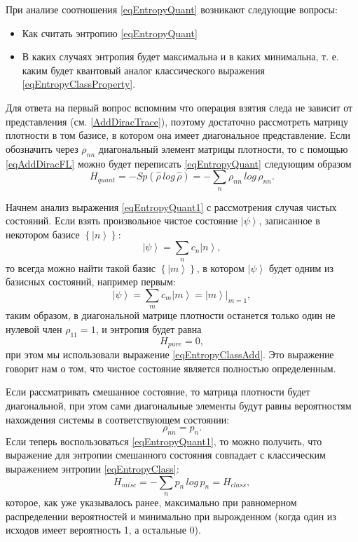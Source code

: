 При анализе соотношения \eqref{eqEntropyQuant} возникают следующие
вопросы:
\begin{itemize}
\item Как считать энтропию \eqref{eqEntropyQuant}
\item В каких случаях энтропия будет максимальна и в каких минимальна,
  т. е. каким будет квантовый аналог классического выражения
  \ref{eqEntropyClassProperty}. 
\end{itemize}

Для ответа на первый вопрос вспомним что операция взятия следа не
зависит от представления (см. \autoref{AddDiracTrace}), поэтому
достаточно рассмотреть матрицу плотности в том базисе, в котором она имеет
диагональное представление. Если обозначить через $\rho_{nn}$
диагональный элемент матрицы плотности, то с помощью \eqref{eqAddDiracFL}
можно будет переписать \eqref{eqEntropyQuant} следующим образом
\begin{equation}
H_{quant} = - Sp \left(\hat{\rho} \, log \, \hat{\rho}\right) = 
- \sum_n \rho_{nn} \, log \, \rho_{nn}.
\label{eqEntropyQuant1}
\end{equation}

Начнем анализ выражения \eqref{eqEntropyQuant1} с рассмотрения случая чистых состояний.
Если взять произвольное чистое состояние $\left|\psi\right>$,
записанное в некотором базисе $\left\{\left|n\right>\right\}$:
\[
\left|\psi\right> = \sum_n c_n \left|n\right>,
\]
то всегда можно найти такой базис $\left\{\left|m\right>\right\}$, в
котором $\left|\psi\right>$ будет одним из базисных состояний, например первым: 
\[
\left|\psi\right> = \sum_m c_m \left|m\right> = 
\left.\left|m\right>\right|_{m = 1},
\]
таким образом, в диагональной матрице плотности останется только один
не нулевой член $\rho_{11} = 1$, и энтропия будет равна
\begin{equation}
H_{pure} = 0,
\label{eqQIEntropyPure}
\end{equation}
при этом мы использовали выражение \eqref{eqEntropyClassAdd}. Это
выражение говорит нам о том, что чистое состояние является полностью
определенным. 

Если рассматривать смешанное состояние, то матрица плотности будет
диагональной, при этом сами диагональные элементы будут равны
вероятностям нахождения системы в соответствующем состоянии:
\[
\rho_{nn} = p_n.
\]
Если теперь воспользоваться \eqref{eqEntropyQuant1}, то можно получить,
что выражение для энтропии смешанного состояния совпадает с
классическим выражением энтропии \eqref{eqEntropyClass}:
\begin{equation}
H_{misc} = - \sum_n p_n \, log \, p_n = H_{class},
\label{eqQIEntropyMisc}
\end{equation}
которое, как уже указывалось ранее, максимально при равномерном распределении
вероятностей и минимально при вырожденном (когда один из исходов имеет
вероятность 1, а остальные 0).

